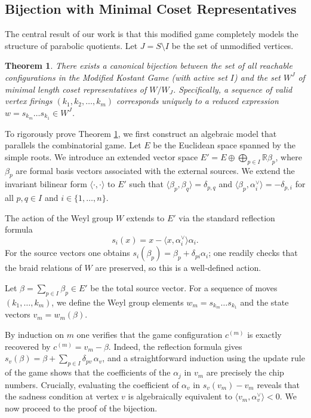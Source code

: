 \documentclass[11pt,a4paper]{amsart}
\newcommand{\R}{\mathbb{R}}
\theoremstyle{plain}
\newtheorem{theorem}{Theorem}[section]
\theoremstyle{definition}
\theoremstyle{remark}
\begin{document}
\subsection{Bijection with Minimal Coset Representatives}

The central result of our work is that this modified game completely models the structure of parabolic quotients. Let $J = S \setminus I$ be the set of unmodified vertices. 

\begin{theorem}
	\label{thm:bijection}
	There exists a canonical bijection between the set of all reachable configurations in the Modified Kostant Game (with active set $I$) and the set $W^J$ of minimal length coset representatives of $W/W_J$. Specifically, a sequence of valid vertex firings $(k_1, k_2, \dots, k_m)$ corresponds uniquely to a reduced expression $w = s_{k_m} \dots s_{k_1} \in W^J$.
\end{theorem}

To rigorously prove Theorem \ref{thm:bijection}, we first construct an algebraic model that parallels the combinatorial game. Let $E$ be the Euclidean space spanned by the simple roots. We introduce an extended vector space $E' = E \oplus \bigoplus_{p \in I} \R \beta_p$, where $\beta_p$ are formal basis vectors associated with the external sources. We extend the invariant bilinear form $\langle \cdot, \cdot \rangle$ to $E'$ such that $\langle \beta_p, \beta_q \rangle = \delta_{p,q}$ and $\langle \beta_p, \alpha_i^\vee \rangle = -\delta_{p,i}$ for all $p, q \in I$ and $i \in \{1, \dots, n\}$. 

The action of the Weyl group $W$ extends to $E'$ via the standard reflection formula 
\[
s_i(x) = x - \langle x, \alpha_i^\vee \rangle \alpha_i .
\]
For the source vectors one obtains $s_i(\beta_p) = \beta_p + \delta_{pi}\alpha_i$; one readily checks that the braid relations of $W$ are preserved, so this is a well‑defined action. 

Let $\beta = \sum_{p \in I} \beta_p \in E'$ be the total source vector. For a sequence of moves $(k_1, \dots, k_m)$, we define the Weyl group elements $w_m = s_{k_m} \dots s_{k_1}$ and the state vectors $v_m = w_m(\beta)$. 

By induction on $m$ one verifies that the game configuration $c^{(m)}$ is exactly recovered by $c^{(m)} = v_m - \beta$. Indeed, the reflection formula gives $s_v(\beta) = \beta + \sum_{p\in I}\delta_{pv}\,\alpha_v$, and a straightforward induction using the update rule of the game shows that the coefficients of the $\alpha_j$ in $v_m$ are precisely the chip numbers. Crucially, evaluating the coefficient of $\alpha_v$ in $s_v(v_m) - v_m$ reveals that the sadness condition at vertex $v$ is algebraically equivalent to $\langle v_m, \alpha_v^\vee \rangle < 0$. We now proceed to the proof of the bijection.
\end{document}
